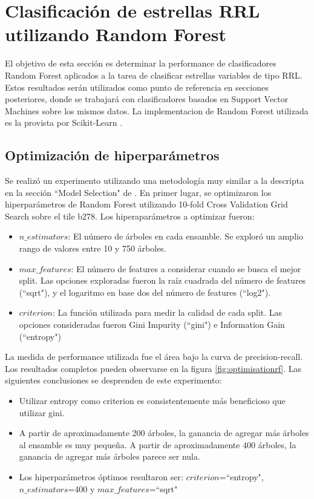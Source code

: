 \chapter{Clasificación de estrellas RRL utilizando Random Forest}

El objetivo de esta sección es determinar la performance de clasificadores Random Forest aplicados a la tarea de clasificar estrellas variables de tipo RRL. Estos resultados serán utilizados como punto de referencia en secciones posteriores, donde se trabajará con clasificadores basados en Support Vector Machines sobre los mismos datos. La implementacion de Random Forest utilizada es la provista por Scikit-Learn \cite{sklearn_api} \cite{pedregosa2011scikit}.

\section{Optimización de hiperparámetros}

Se realizó un experimento utilizando una metodología muy similar a la descripta en la sección ``Model Selection" de \cite{jbc}. En primer lugar, se optimizaron los hiperparámetros de Random Forest utilizando 10-fold Cross Validation Grid Search sobre el tile b278. Los hiperaparámetros a optimizar fueron:

\begin{itemize}
\item \textbf{$n\_estimators$}: El número de árboles en cada ensamble. Se exploró un amplio rango de valores entre 10 y 750 árboles.
\item \textbf{$max\_features$}: El número de features a considerar cuando se busca el mejor split. Las opciones exploradas fueron la raíz cuadrada del número de features (``sqrt"), y el logaritmo en base dos del número de features (``log2").
\item \textbf{$criterion$}: La función utilizada para medir la calidad de cada split. Las opciones consideradas fueron Gini Impurity (``gini") e Information Gain (``entropy")
\end{itemize}

La medida de performance utilizada fue el área bajo la curva de precision-recall. Los resultados completos pueden observarse en la figura \ref{fig:optimisationrf}. Las siguientes conclusiones se desprenden de este experimento:

\begin{itemize}
\item Utilizar entropy como criterion es consistentemente más beneficioso que utilizar gini.
\item A partir de aproximadamente 200 árboles, la ganancia de agregar más árboles al ensamble es muy pequeña. A partir de aproximadamente 400 árboles, la ganancia de agregar más árboles parece ser nula.
\item Los hiperparámetros óptimos resultaron ser: $criterion$=``entropy", $n\_estimators$=400 y $max\_features$=``sqrt"
\end{itemize}

